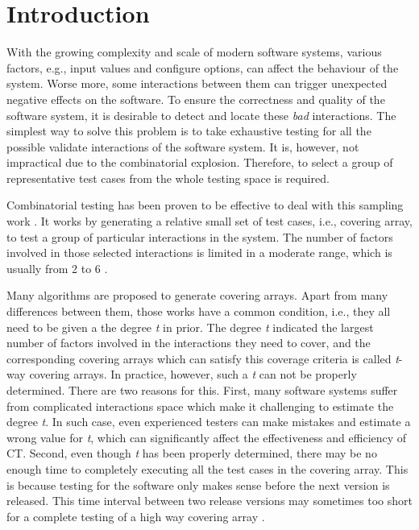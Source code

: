 \documentclass[conference]{IEEEtran}
\theoremstyle{definition}
\begin{document}
\section{Introduction}
With the growing complexity and scale of modern software systems, various factors, e.g., input values and configure options, can affect the behaviour of the system. Worse more, some interactions between them can trigger unexpected negative effects on the software. To ensure the correctness and quality of the software system, it is desirable to detect and locate these \emph{bad} interactions. The simplest way to solve this problem is to take exhaustive testing for all the possible validate interactions of the software system. It is, however, not impractical due to the combinatorial explosion. Therefore, to select a group of representative test cases from the whole testing space is required.

Combinatorial testing has been proven to be effective to deal with this sampling work \cite{nie2011survey}. It works by generating a relative small set of test cases, i.e., covering array, to test a group of particular interactions in the system. The number of factors involved in those selected interactions is limited in a moderate range, which is usually from 2 to 6 \cite{kuhn2002investigation}.


Many algorithms are proposed to generate covering arrays. Apart from many differences between them,  those works have a common condition, i.e., they all need to be given a the degree \emph{t} in prior.  The degree \emph{t} indicated the largest number of factors involved in the interactions they need to cover, and the corresponding covering arrays which can satisfy this coverage criteria is called \emph{t}-way covering arrays. In practice, however, such a \emph{t} can not be properly determined. There are two reasons for this. First, many software systems suffer from complicated interactions space which make it challenging to estimate the degree \emph{t}. In such case, even experienced testers can make mistakes and estimate a wrong value for \emph{t}, which can significantly affect the effectiveness and efficiency of CT.  Second, even though \emph{t} has been properly determined, there may be no enough time to completely executing all the test cases in the covering array. This is because testing for the software only makes sense before the next version is released. This time interval between two release versions may sometimes too short for a complete testing of a high way covering array \cite{fouche2009incremental}.
\end{document}
